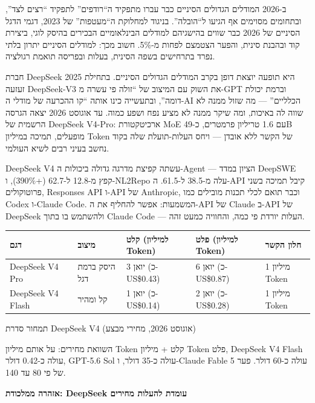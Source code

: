 ב-2026 המודלים הגדולים הסיניים כבר עברו מתפקיד ה“רודפים” לתפקיד “רצים לצד”, ובתחומים מסוימים אף הגיעו ל“הובלה”. בניגוד למחלוקת ה“מעטפות” של 2023, דגמי הדגל הסיניים של 2026 כבר שווים בהישגיהם למודלים הבינלאומיים הבכירים בהיסק לוגי, ביצירת קוד ובהבנת סינית, והפער הצטמצם לפחות מ-5\%. חשוב מכך: למודלים הסיניים יתרון בלתי נפרד בתרחישים בשפה הסינית, בעלות ובפריסה תואמת רגולציה.


חברת DeepSeek היא תופעה יוצאת דופן בקרב המודלים הגדולים הסיניים. בתחילת 2025 זעזעה DeepSeek-V3 את השוק עם המיצוב של “זולה פי עשרה מ-GPT וברמת יכולת דומה”, ובתעשייה כינו אותה “קו ההכרעה של מודלי ה-AI הכלליים” — מה שזול ממנה לא שווה לה באיכות, ומה שיקר ממנה לא מציע נפח ושפע כמוה. עד אוגוסט 2026 יצאה הגרסה הרשמית של DeepSeek V4-Pro: ארכיטקטורת MoE עם 1.6 טריליון פרמטרים, כ-49B מופעלים, תמיכה במיליון Token של הקשר ללא אובדן — ויחס העלות-תועלת שלה בקוד נחשב בעיני רבים לשיא העולמי.

DeepSeek V4 עשתה קפיצת מדרגה גדולה ביכולות ה-Agent — הציון במדד DeepSWE קפץ מ-12.8 ל-62.7 (+390\%), ו-NL2Repo עלה מ-38.5 ל-61.5. ה-API קיבל תמיכה בשני פרוטוקולים, Responses API ו-API של Anthropic, וכבר תואם לכלי תכנות מובילים כמו Codex ו-Claude Code. המשמעות: אפשר להחליף את ה-API של Claude ב-API של DeepSeek ולהשתמש בו בתוך Claude Code — העלות יורדת פי כמה, והחוויה כמעט זהה.

\begin{center}
\begin{tabularx}{\linewidth}{|X|X|X|X|X|}
\hline
\textbf{דגם} & \textbf{מיצוב} & \textbf{קלט (למיליון Token)} & \textbf{פלט (למיליון Token)} & \textbf{חלון הקשר} \tabularnewline
\hline
DeepSeek V4 Pro & היסק ברמת דגל & 3 יואן (כ-US\$0.43) & 6 יואן (כ-US\$0.87) & 1 מיליון Token \tabularnewline
DeepSeek V4 Flash & קל ומהיר & 1 יואן (כ-US\$0.14) & 2 יואן (כ-US\$0.28) & 1 מיליון Token \tabularnewline
\hline
\end{tabularx}
\end{center}

\begin{center}\small\color{gray}תמחור סדרת DeepSeek V4 (אוגוסט 2026, מחירי מבצע)\end{center}

השוואת מחירים: על אותם מיליון Token קלט + מיליון Token פלט, DeepSeek V4 Flash עולה כ-0.42 דולר, GPT-5.6 Sol עולה כ-35 דולר, ו-Claude Fable 5 עולה כ-60 דולר. פער של פי 80 עד 140.

\textbf{אזהרה ממלכודת: DeepSeek עומדת להעלות מחירים}\par

